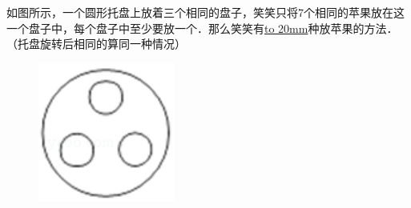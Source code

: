 \item {
    如图所示，一个圆形托盘上放着三个相同的盘子，笑笑只将7个相同的苹果放在这一个盘子中，每个盘子中至少要放一个．那么笑笑有\underline{\hbox to 20mm{}}种放苹果的方法．（托盘旋转后相同的算同一种情况）
    \begin{figure}[H] 
        \centering
        \includegraphics[width=0.4\textwidth]{./pics/Chapter_6/2015_4.png}
    \end{figure}
}




